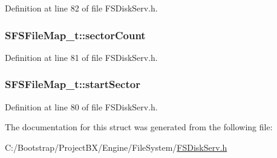 Definition at line 82 of file FSDiskServ.h.\hypertarget{struct_s_f_s_file_map__t_a116506047ffd9b13cc76bc355744af4}{
\subsubsection[{sectorCount}]{ {\bf SFSFileMap\_\-t::sectorCount}}}
\label{struct_s_f_s_file_map__t_a116506047ffd9b13cc76bc355744af4}




Definition at line 81 of file FSDiskServ.h.\hypertarget{struct_s_f_s_file_map__t_1d880b3182af88ac4669dcef9fbf359a}{
\subsubsection[{startSector}]{ {\bf SFSFileMap\_\-t::startSector}}}
\label{struct_s_f_s_file_map__t_1d880b3182af88ac4669dcef9fbf359a}




Definition at line 80 of file FSDiskServ.h.

The documentation for this struct was generated from the following file:\begin{CompactItemize}
\item 
C:/Bootstrap/ProjectBX/Engine/FileSystem/\hyperlink{_f_s_disk_serv_8h}{FSDiskServ.h}\end{CompactItemize}
